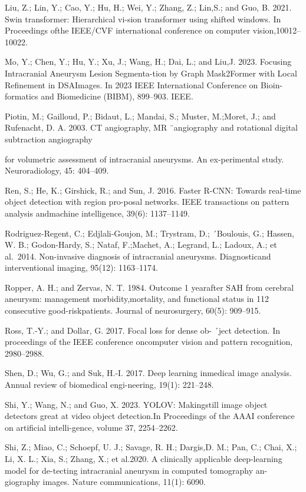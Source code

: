 \documentclass[
  10
]{article}
\begin{document}
Liu, Z.; Lin, Y.; Cao, Y.; Hu, H.; Wei, Y.; Zhang, Z.; Lin,S.; and Guo,
B. 2021. Swin transformer: Hierarchical vi-sion transformer using
shifted windows. In Proceedings ofthe IEEE/CVF international conference
on computer vision,10012--10022.

Mo, Y.; Chen, Y.; Hu, Y.; Xu, J.; Wang, H.; Dai, L.; and Liu,J. 2023.
Focusing Intracranial Aneurysm Lesion Segmenta-tion by Graph Mask2Former
with Local Refinement in DSAImages. In 2023 IEEE International
Conference on Bioin-formatics and Biomedicine (BIBM), 899--903. IEEE.

Piotin, M.; Gailloud, P.; Bidaut, L.; Mandai, S.; Muster, M.;Moret, J.;
and Rufenacht, D. A. 2003. CT angiography, MR ¨angiography and
rotational digital subtraction angiography

for volumetric assessment of intracranial aneurysms. An ex-perimental
study. Neuroradiology, 45: 404--409.

Ren, S.; He, K.; Girshick, R.; and Sun, J. 2016. Faster R-CNN: Towards
real-time object detection with region pro-posal networks. IEEE
transactions on pattern analysis andmachine intelligence, 39(6):
1137--1149.

Rodriguez-Regent, C.; Edjlali-Goujon, M.; Trystram, D.; ´Boulouis, G.;
Hassen, W. B.; Godon-Hardy, S.; Nataf, F.;Machet, A.; Legrand, L.;
Ladoux, A.; et al.~2014. Non-invasive diagnosis of intracranial
aneurysms. Diagnosticand interventional imaging, 95(12): 1163--1174.

Ropper, A. H.; and Zervas, N. T. 1984. Outcome 1 yearafter SAH from
cerebral aneurysm: management morbidity,mortality, and functional status
in 112 consecutive good-riskpatients. Journal of neurosurgery, 60(5):
909--915.

Ross, T.-Y.; and Dollar, G. 2017. Focal loss for dense ob- ´ject
detection. In proceedings of the IEEE conference oncomputer vision and
pattern recognition, 2980--2988.

Shen, D.; Wu, G.; and Suk, H.-I. 2017. Deep learning inmedical image
analysis. Annual review of biomedical engi-neering, 19(1): 221--248.

Shi, Y.; Wang, N.; and Guo, X. 2023. YOLOV: Makingstill image object
detectors great at video object detection.In Proceedings of the AAAI
conference on artificial intelli-gence, volume 37, 2254--2262.

Shi, Z.; Miao, C.; Schoepf, U. J.; Savage, R. H.; Dargis,D. M.; Pan, C.;
Chai, X.; Li, X. L.; Xia, S.; Zhang, X.; et al.2020. A clinically
applicable deep-learning model for de-tecting intracranial aneurysm in
computed tomography an-giography images. Nature communications, 11(1):
6090.
\end{document}
